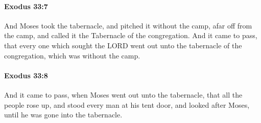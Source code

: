 		\paragraph{Exodus 33:7} %
			\label{EXODUS-33-7}

			And Moses took the tabernacle, and pitched it without the camp, afar off from the camp, and called it the Tabernacle of the congregation. And it came to pass, that every one which sought the LORD went out unto the tabernacle of the congregation, which was without the camp.


		\paragraph{Exodus 33:8} %
			\label{EXODUS-33-8}

			And it came to pass, when Moses went out unto the tabernacle, that all the people rose up, and stood every man at his tent door, and looked after Moses, until he was gone into the tabernacle.


